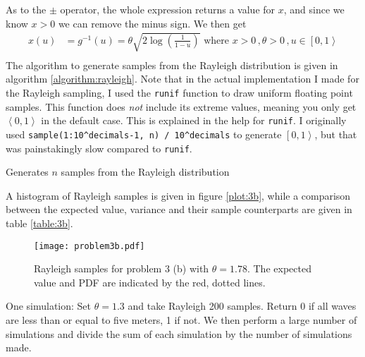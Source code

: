 \documentclass[a4paper,english,12pt]{article}
\begin{document}
As to the $\pm$ operator, the whole expression returns a value for $x$, and
since we know $x>0$ we can remove the minus sign. We then get
\begin{align*}
  x(u) &= g^{-1}(u) = \theta\sqrt{2\log{\left(\frac{1}{1 - u}\right)}}
   \text{ where } x>0\, , \theta>0\, , u \in \left[0,1\right>
   \\
\end{align*}%
The algorithm to generate samples from the Rayleigh distribution is given in
algorithm \vref{algorithm:rayleigh}. Note that in the actual implementation I
made for the Rayleigh sampling, I used the \texttt{runif} function to draw
uniform floating point samples. This function does \textit{not} include its
extreme values, meaning you only get $\left<0,1\right>$ in the default case.
This is explained in the help for \texttt{runif}. I originally used
\texttt{sample(1:10\^{}decimals-1, n) / 10\^{}decimals} to generate
$\left[0,1\right>$, but that was painstakingly slow compared to \texttt{runif}.

\begin{algorithm}
  \caption{Generates $n$ samples from the Rayleigh distribution}
  \label{algorithm:rayleigh}
  \begin{algorithmic}[1]
         \Comment{Random float $u \in \left[0,1\right>$}
      \EndFor
        \State {}
    \EndFunction
  \end{algorithmic}
\end{algorithm}

A histogram of Rayleigh samples is given in figure \vref{plot:3b}, while a
comparison between the expected value, variance and their sample counterparts
are given in table \vref{table:3b}.



\begin{figure}
  \centering
  \texttt{[image: problem3b.pdf]}
  \caption{Rayleigh samples for problem 3 (b) with $\theta=1.78$. The expected
  value and PDF are indicated by the red, dotted lines.}
  \label{plot:3b}
\end{figure}

One simulation: Set $\theta=1.3$ and take Rayleigh 200 samples. Return 0 if all
waves are less than or equal to five meters, 1 if not. We then perform a large
number of simulations and divide the sum of each simulation by the number of
simulations made.
\end{document}
